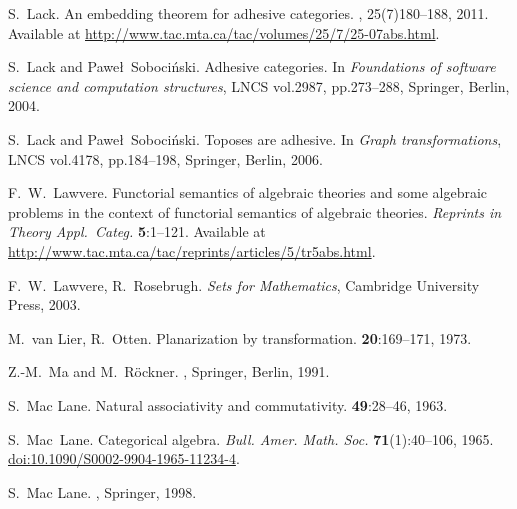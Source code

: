 \begin{thebibliography}{RSW00}
    S.\ Lack.
    \newblock An embedding theorem for adhesive categories.
    , 25(7)180--188, 2011.
    \newblock Available at
    \href{http://www.tac.mta.ca/tac/volumes/25/7/25-07abs.html}{http://www.tac.mta.ca/tac/volumes/25/7/25-07abs.html}.

    S.\ Lack and Pawe\l\ Soboci\'nski. 
    \newblock Adhesive categories. 
    \newblock In {\em Foundations of software science and computation
    structures}, LNCS vol.2987, pp.273--288, Springer, Berlin, 2004.
    
    S.\ Lack and Pawe\l\ Soboci\'nski. 
    \newblock Toposes are adhesive. 
    \newblock In {\em Graph transformations}, LNCS vol.4178, pp.184--198,
    Springer, Berlin, 2006.

    F.\ W.\ Lawvere.
    \newblock Functorial semantics of algebraic theories and
    some algebraic problems in the context of functorial semantics of algebraic
    theories.
    \newblock \textsl{Reprints in Theory Appl.\ Categ.} {\bf 5}:1--121.
    \newblock 
    Available at
    \href{http://www.tac.mta.ca/tac/reprints/articles/5/tr5abs.html}
    {http://www.tac.mta.ca/tac/reprints/articles/5/tr5abs.html}.

    F.\ W.\ Lawvere, R.\ Rosebrugh.
    \newblock \emph{Sets for Mathematics},
    Cambridge University Press, 2003.

    M.\ van Lier, R.\ Otten.
    \newblock Planarization by transformation.
     {\bf 20}:169--171, 1973.

    Z.-M.\ Ma and M.\ R\"ockner.
    , Springer, Berlin, 1991.

    S.\ Mac Lane.
    \newblock Natural associativity and commutativity.
     {\bf 49}:28--46, 1963. 

    S.\ Mac\ Lane.
    \newblock Categorical algebra.
    \newblock \emph{Bull. Amer. Math. Soc.} {\bf 71}(1):40--106, 1965.
    \newblock 
    \href{http://doi.org/10.1090/S0002-9904-1965-11234-4}{doi:10.1090/S0002-9904-1965-11234-4}.

    S.\ Mac Lane.
    ,
    Springer, 1998.
    

\end{thebibliography}
